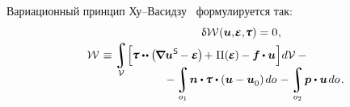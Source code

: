 \begin{otherlanguage}{russian}
Вариационный принцип Ху\hbox{--}Васидзу~\cite{washizu} %
формулируется так:
\nopagebreak\vspace{0.1em}\begin{multline}\label{huwashizuvariationalprinciple}
\hfil \variation{\mathcal{W}} \hspace{0.1ex} (\bm{u}, \hspace{-0.32ex}\mathboldepsilon, \hspace{-0.32ex}\mathboldtau) = 0 \hspace{0.1ex},\\[-0.1em]
%
\shoveleft{\displaystyle \mathcal{W} \hspace{0.2ex} \equiv
\integral\displaylimits_{\mathcal{V}} \hspace{-0.4ex}
\left[^{\mathstrut} \hspace{-0.2ex}
\mathboldtau \dotdotp \hspace{-0.4ex} \left( \hspace{-0.2ex} \boldnabla {\bm{u}}^{\hspace{0.08ex}\mathsf{S}} \hspace{-0.2ex} - \mathboldepsilon \hspace{-0.1ex} \right) \hspace{-0.25ex} + \hspace{0.1ex} \Pi(\hspace{-0.1ex}\mathboldepsilon\hspace{-0.1ex})\hspace{-0.1ex} -
\bm{f} \hspace{-0.1ex} \dotp \bm{u}
\hspace{0.1ex} \right] \hspace{-0.32ex} d\mathcal{V} \hspace{.5ex} - \hfill} \\[-1.2em]
%
\hspace{8em} \displaystyle - \integral\displaylimits_{o_1} \hspace{-0.25ex} \bm{n} \dotp \hspace{-0.1ex} \mathboldtau \dotp \left( \bm{u} - \bm{u}_{\raisemath{-0.1em}{0}} \right) \hspace{-0.1ex} do \hspace{0.2ex} -
\integral\displaylimits_{o_2} \hspace{-0.2ex} \bm{p} \dotp \bm{u} \hspace{0.25ex} do \hspace{0.2ex}.
\end{multline}


\end{otherlanguage}
